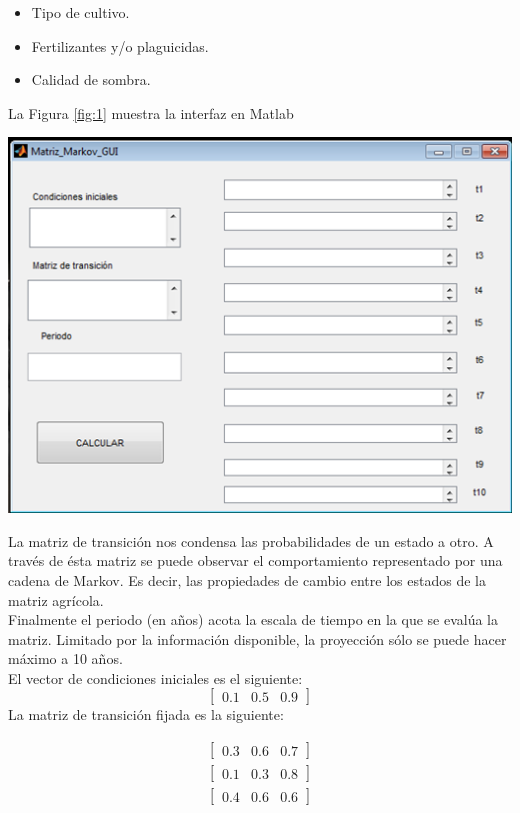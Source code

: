 \begin{itemize}
\item Tipo de cultivo.
\item Fertilizantes y/o plaguicidas.
\item Calidad de sombra.
\end{itemize}

La Figura \ref{fig:1} muestra la interfaz en Matlab

\begin{center}
\includegraphics[scale=0.45]{imagenes/4-agricola/1.png}
\label{fig:1}
\end{center}

La matriz de transición nos condensa las probabilidades de un estado a otro. A través de ésta matriz se puede observar el comportamiento representado por una cadena de Markov. Es decir, las propiedades de cambio entre los estados de la matriz agrícola.\\

Finalmente el periodo (en años) acota la escala de tiempo en la que se evalúa la matriz. Limitado por la información disponible, la proyección sólo se puede hacer máximo a 10 años.\\

El vector de condiciones iniciales es el siguiente:
$$\left[\begin{array}{ccc}
0{.}1&0{.}5&0{.}9
\end{array}\right]$$
La matriz de transición fijada es la siguiente:

\begin{align*}
\left[\begin{array}{ccc}
0{.}3&0{.}6&0{.}7
\end{array}\right]\\
\left[\begin{array}{ccc}
0{.}1&0{.}3&0{.}8
\end{array}\right]\\
\left[\begin{array}{ccc}
0{.}4&0{.}6&0{.}6
\end{array}\right]
\end{align*}

